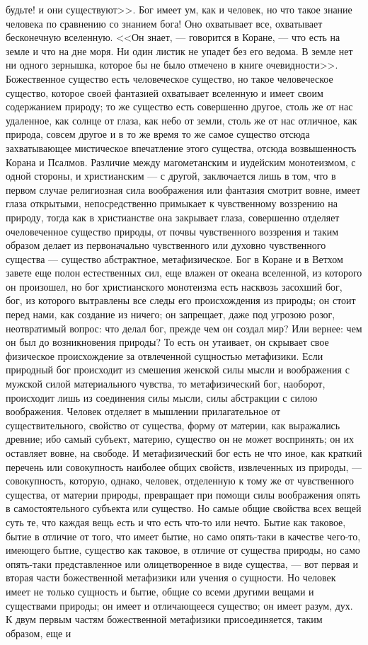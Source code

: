 \documentclass[12pt]{article}
\begin{document}
будьте! и они существуют>>. Бог имеет ум, как и человек, но что такое знание человека по сравнению со знанием бога! Оно охватывает все, охватывает бесконечную вселенную. <<Он знает, --- говорится в Коране, --- что есть на земле и что на дне моря. Ни один листик не упадет без его ведома. В земле нет ни одного зернышка, которое бы не было отмечено в книге очевидности>>. Божественное существо есть человеческое существо, но такое человеческое существо, которое своей фантазией охватывает вселенную и имеет своим содержанием природу; то же существо есть совершенно другое, столь же от нас удаленное, как солнце от глаза, как небо от земли, столь же от нас отличное, как природа, совсем другое и в то же время то же самое существо отсюда захватывающее мистическое впечатление этого существа, отсюда возвышенность Корана и Псалмов. Различие между магометанским и иудейским монотеизмом, с одной стороны, и христианским --- с другой, заключается лишь в том, что в первом случае религиозная сила воображения или фантазия смотрит вовне, имеет глаза открытыми, непосредственно примыкает к чувственному воззрению на природу, тогда как в христианстве она закрывает глаза, совершенно отделяет очеловеченное существо природы, от почвы чувственного воззрения и таким образом делает из первоначально чувственного или духовно чувственного существа --- существо абстрактное, метафизическое. Бог в Коране и в Ветхом завете еще полон естественных сил, еще влажен от океана вселенной, из которого он произошел, но бог христианского монотеизма есть насквозь засохший бог, бог, из которого вытравлены все следы его происхождения из природы; он стоит перед нами, как создание из ничего; он запрещает, даже под угрозою розог, неотвратимый вопрос: что делал бог, прежде чем он создал мир? Или вернее: чем он был до возникновения природы? То есть он утаивает, он скрывает свое физическое происхождение за отвлеченной сущностью метафизики. Если природный бог происходит из смешения женской силы мысли и воображения с мужской силой материального чувства, то метафизический бог, наоборот, происходит лишь из соединения силы мысли, силы абстракции с силою воображения. Человек отделяет в мышлении прилагательное от существительного, свойство от существа, форму от материи, как выражались древние; ибо самый субъект, материю, существо он не может воспринять; он их оставляет вовне, на свободе. И метафизический бог есть не что иное, как краткий перечень или совокупность наиболее общих свойств, извлеченных из природы, --- совокупность, которую, однако, человек, отделенную к тому же от чувственного существа, от материи природы, превращает при помощи силы воображения опять в самостоятельного субъекта или существо. Но самые общие свойства всех вещей суть те, что каждая вещь есть и что есть что-то или нечто. Бытие как таковое, бытие в отличие от того, что имеет бытие, но само опять-таки в качестве чего-то, имеющего бытие, существо как таковое, в отличие от существа природы, но само опять-таки представленное или олицетворенное в виде существа, --- вот первая и вторая части божественной метафизики или учения о сущности. Но человек имеет не только сущность и бытие, общие со всеми другими вещами и существами природы; он имеет и отличающееся существо; он имеет разум, дух. К двум первым частям божественной метафизики присоединяется, таким образом, еще и 
\end{document}
